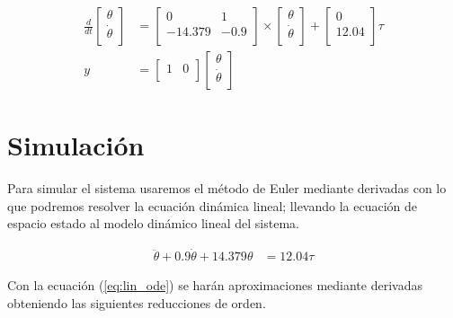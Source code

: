 \documentclass[12pt]{article}
\begin{document}
\begin{equation}
    \begin{split}
        \frac{d}{dt}
    \begin{bmatrix}
        \theta  \\
        \dot{\theta} \\ 
    \end{bmatrix}&=\begin{bmatrix}
        0 & 1  \\
        -14.379 & -0.9 \\ 
    \end{bmatrix}
    \times
    \begin{bmatrix}
    \theta \\
    \dot{\theta} \\
    \end{bmatrix}+\begin{bmatrix}
    0 \\
    12.04 \\
    \end{bmatrix}\tau\\ 
    y&=\begin{bmatrix}
    1 & 0 \\
    \end{bmatrix}
    \begin{bmatrix}
    \theta \\
    \dot{\theta} \\
    \end{bmatrix}
    \end{split}
    \label{eq:lined_model_no_constants}
\end{equation}
\newpage
\section{Simulación}

Para simular el sistema usaremos el método de Euler mediante derivadas con lo que podremos resolver la ecuación dinámica lineal; llevando la ecuación de espacio estado al modelo dinámico lineal del sistema.

\begin{equation}
    \begin{split}
    \ddot{\theta}+0.9\dot{\theta}+14.379\theta&=12.04\tau
    \label{eq:lin_ode}
    \end{split}
\end{equation}

Con la ecuación (\ref{eq:lin_ode}) se harán aproximaciones mediante derivadas obteniendo las siguientes reducciones de orden\cite{reyes:2020}.
\end{document}
